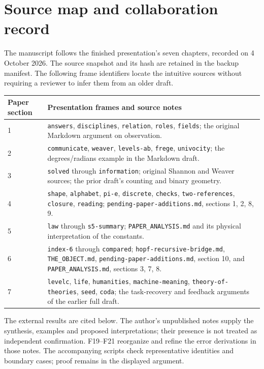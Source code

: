 \documentclass[11pt,a4paper]{article}
\begin{document}
\section{Source map and collaboration record}
\label{app:provenance}
The manuscript follows the finished presentation's seven chapters, recorded
on 4 October 2026. The source snapshot and its hash are retained in the backup
manifest. The following frame identifiers locate the intuitive sources without
requiring a reviewer to infer them from an older draft.

\noindent\begin{tabularx}{\linewidth}{@{}p{28mm}>{\raggedright\arraybackslash}X@{}}
\toprule Paper section & Presentation frames and source notes\\\midrule
1 & \texttt{answers}, \texttt{disciplines}, \texttt{relation}, \texttt{roles},
\texttt{fields}; the original Markdown argument on observation.\\
2 & \texttt{communicate}, \texttt{weaver}, \texttt{levels-ab}, \texttt{frege},
\texttt{univocity}; the degrees/radians example in the Markdown draft.\\
3 & \texttt{solved} through \texttt{information}; original Shannon and Weaver
sources; the prior draft's counting and binary geometry.\\
4 & \texttt{shape}, \texttt{alphabet}, \texttt{pi-e}, \texttt{discrete},
\texttt{checks}, \texttt{two-references}, \texttt{closure}, \texttt{reading};
\texttt{pending-paper-additions.md}, sections 1, 2, 8, 9.\\
5 & \texttt{law} through \texttt{s5-summary};
\texttt{PAPER\_ANALYSIS.md} and its physical interpretation of the constants.\\
6 & \texttt{index-6} through \texttt{compared};
\texttt{hopf-recursive-bridge.md}, \texttt{THE\_OBJECT.md},
\texttt{pending-paper-additions.md}, section 10, and
\texttt{PAPER\_ANALYSIS.md}, sections 3, 7, 8.\\
7 & \texttt{levelc}, \texttt{life}, \texttt{humanities}, \texttt{machine-meaning},
\texttt{theory-of-theories}, \texttt{seed}, \texttt{coda};
the task-recovery and feedback arguments of the earlier full draft.\\
\bottomrule
\end{tabularx}

The external results are cited below. The author's unpublished notes supply
the synthesis, examples and proposed interpretations; their presence is not
treated as independent confirmation. F19--F21 reorganize and refine the error
derivations in those notes. The accompanying scripts check representative
identities and boundary cases; proof remains in the displayed argument.
\end{document}
